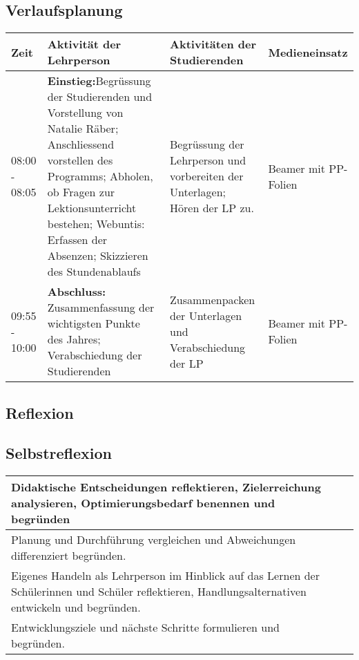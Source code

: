 \documentclass[
11pt,
captions=tableheading,
headsepline,
footsepline, 
captions=tableheading,
parskip=half-,
]{scrartcl}
\begin{document}
\begin{landscape}
\subsection{Verlaufsplanung}
\begin{longtable}{@{}lp{10cm}p{8cm}l@{}}
    \toprule
    \textbf{Zeit} & \textbf{Aktivität der Lehrperson} & \textbf{Aktivitäten der Studierenden} & \textbf{Medieneinsatz} \\ 
    \midrule
    08:00 - 08:05 & \textbf{Einstieg:}Begrüssung der Studierenden und Vorstellung von Natalie Räber; Anschliessend vorstellen des Programms; Abholen, ob Fragen zur Lektionsunterricht bestehen; Webuntis: Erfassen der Absenzen; Skizzieren des Stundenablaufs & Begrüssung der Lehrperson und vorbereiten der Unterlagen; Hören der LP zu. & Beamer mit PP-Folien\\
    \midrule
    09:55 - 10:00 & \textbf{Abschluss:} Zusammenfassung der wichtigsten Punkte des Jahres; Verabschiedung der Studierenden & Zusammenpacken der Unterlagen und Verabschiedung der LP & Beamer mit PP-Folien\\
    \bottomrule
\end{longtable}
\end{landscape}
\clearpage

\begin{landscape}
    
    \section{Reflexion}
    \subsection{Selbstreflexion}
    \begin{table}[H]
        \centering
        \label{tab:Relexion}
        \caption{Kognitive Taxonomiestufen nach Bloom \cite{bloom1956taxonomy}, adaptiert von \cite{BerufspädagogischesKonzept_BauschuleAarau}.}
        \begin{longtable}{@{}p{10cm}|p{13cm}@{}}
            \toprule
            Didaktische Entscheidungen reflektieren, Zielerreichung analysieren, Optimierungsbedarf benennen und begründen & {} \\
            \midrule
            Planung und Durchführung vergleichen und Abweichungen differenziert begründen. & {} \\
            \midrule
            Eigenes Handeln als Lehrperson im Hinblick auf das Lernen der Schülerinnen und Schüler reflektieren, Handlungsalternativen entwickeln und begründen. & {} \\
            \midrule
            Entwicklungsziele und nächste Schritte formulieren und begründen.   & {} \\
            \bottomrule
        \end{longtable}
    \end{table}
\end{landscape}
    
\end{document}
